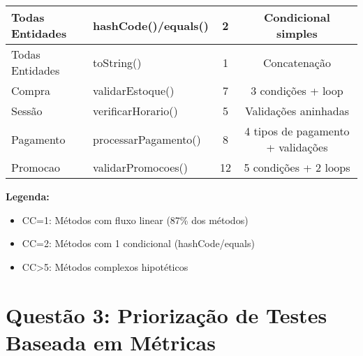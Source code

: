\documentclass{article}
\begin{document}
\begin{table}[H]
{\begin{tabular}{|l|l|c|c|}
Todas Entidades & hashCode()/equals() & 2 & Condicional simples \\ \hline
Todas Entidades & toString() & 1 & Concatenação \\ \hline
Compra & validarEstoque() & 7 & 3 condições + loop \\ \hline
Sessão & verificarHorario() & 5 & Validações aninhadas \\ \hline
Pagamento & processarPagamento() & 8 & 4 tipos de pagamento + validações \\ \hline
Promocao & validarPromocoes() & 12 & 5 condições + 2 loops \\ \hline
\end{tabular}%
}
\end{table}

\textbf{Legenda:}
\begin{itemize}
\item CC=1: Métodos com fluxo linear (87\% dos métodos)
\item CC=2: Métodos com 1 condicional (hashCode/equals)
\item CC>5: Métodos complexos hipotéticos
\end{itemize}

\section*{Questão 3: Priorização de Testes Baseada em Métricas}

\begin{table}[H] %
\centering
\caption{Elementos Prioritários para Testes}
\end{table}
\end{document}
